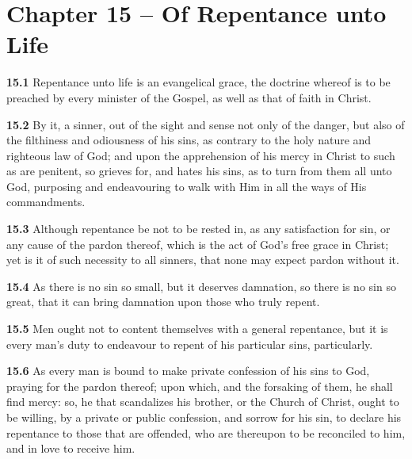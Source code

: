 \section{Chapter 15 -- Of Repentance unto Life}

\par\textbf{15.1} Repentance unto life is an evangelical grace, the doctrine whereof is to be preached by every minister of the Gospel, as well as that of faith in Christ.   

\par\textbf{15.2} By it, a sinner, out of the sight and sense not only of the danger, but also of the filthiness and odiousness of his sins, as contrary to the holy nature and righteous law of God; and upon the apprehension of his mercy in Christ to such as are penitent, so grieves for, and hates his sins, as to turn from them all unto God, purposing and endeavouring to walk with Him in all the ways of His commandments.   

\par\textbf{15.3} Although repentance be not to be rested in, as any satisfaction for sin, or any cause of the pardon thereof, which is the act of God's free grace in Christ; yet is it of such necessity to all sinners, that none may expect pardon without it.   

\par\textbf{15.4} As there is no sin so small, but it deserves damnation, so there is no sin so great, that it can bring damnation upon those who truly repent.   

\par\textbf{15.5} Men ought not to content themselves with a general repentance, but it is every man's duty to endeavour to repent of his particular sins, particularly.   

\par\textbf{15.6} As every man is bound to make private confession of his sins to God, praying for the pardon thereof; upon which, and the forsaking of them, he shall find mercy: so, he that scandalizes his brother, or the Church of Christ, ought to be willing, by a private or public confession, and sorrow for his sin, to declare his repentance to those that are offended, who are thereupon to be reconciled to him, and in love to receive him.  

